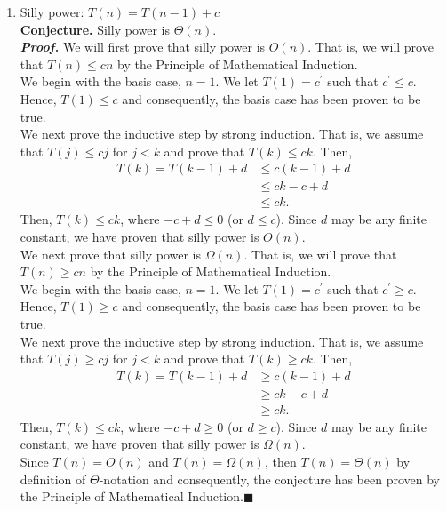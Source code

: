 \documentclass{article}
\begin{document}
\begin{enumerate}[leftmargin=35px,label=(\textbf{\alph*})]
\item Silly power: $T(n) = T(n-1) + c$\\
\textbf{Conjecture.} Silly power is $\Theta(n)$.\\
\textit{\textbf{Proof.}} We will first prove that silly power is $O(n)$. That is, we will prove that $T(n) \leq cn$ by the Principle of Mathematical Induction.\\

We begin with the basis case, $n = 1$. We let $T(1) = c^\prime$ such that $c^\prime \leq c$. Hence, $T(1) \leq c$ and consequently, the basis case has been proven to be true.\\

We next prove the inductive step by strong induction. That is, we assume that $T(j) \leq cj$ for $j < k$ and prove that $T(k) \leq ck$. Then,
\begin{align*}
T(k) = T(k - 1) + d &\leq c(k - 1) + d\\
&\leq ck - c + d\\
&\leq ck.
\end{align*}
Then, $T(k) \leq ck$, where $-c + d \leq 0$ (or $d \leq c$). Since $d$ may be any finite constant, we have proven that silly power is $O(n)$.\\

We next prove that silly power is $\Omega(n)$. That is, we will prove that $T(n) \geq cn$ by the Principle of Mathematical Induction.\\

We begin with the basis case, $n = 1$. We let $T(1) = c^\prime$ such that $c^\prime \geq c$. Hence, $T(1) \geq c$ and consequently, the basis case has been proven to be true.\\

We next prove the inductive step by strong induction. That is, we assume that $T(j) \geq cj$ for $j < k$ and prove that $T(k) \geq ck$. Then,
\begin{align*}
T(k) = T(k - 1) + d &\geq c(k - 1) + d\\
&\geq ck - c + d\\
&\geq ck.
\end{align*}
Then, $T(k) \leq ck$, where $-c + d \geq 0$ (or $d \geq c$). Since $d$ may be any finite constant, we have proven that silly power is $\Omega(n)$.\\

Since $T(n) = O(n)$ and $T(n) = \Omega(n)$, then $T(n) = \Theta(n)$ by definition of $\Theta$-notation and consequently, the conjecture has been proven by the Principle of Mathematical Induction.\hfill$\blacksquare$
\end{enumerate}
\end{document}
